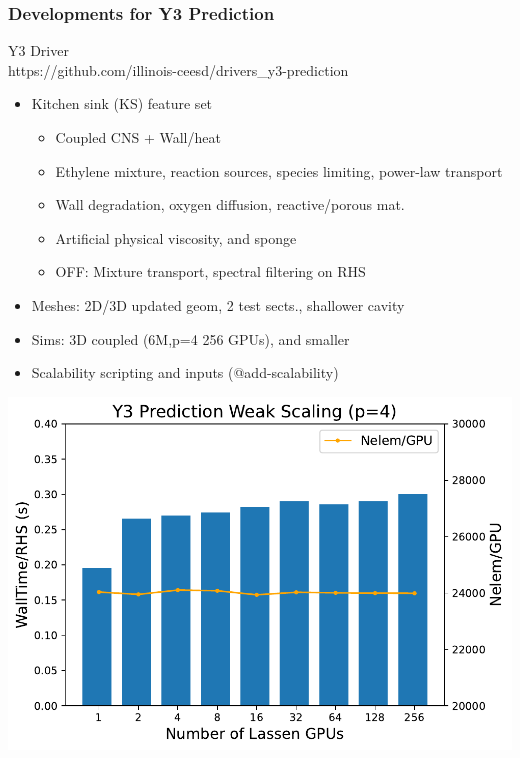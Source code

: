\begin{frame}\frametitle{Developments for Y3 Prediction}
\begin{center}
Y3 Driver\\
https://github.com/illinois-ceesd/drivers\_y3-prediction
\end{center}
\begin{multicols}{2}
\begin{itemize}
\item Kitchen sink (KS) feature set
  \begin{itemize}
  \item Coupled CNS + Wall/heat
  \item Ethylene mixture, reaction sources, species limiting, power-law transport
  \item Wall degradation, oxygen diffusion, reactive/porous mat.
  \item Artificial physical viscosity, and sponge
  \item OFF: Mixture transport, spectral filtering on RHS
  \end{itemize}
\item Meshes: 2D/3D updated geom, 2 test sects., shallower cavity
\item Sims: 3D coupled (6M,p=4 256 GPUs), and smaller
\item Scalability scripting and inputs (@add-scalability)
\end{itemize}
\includegraphics[width=.48\textwidth]{figures/y3-prediction_weak_scaling.pdf}
\end{multicols}
\end{frame}

